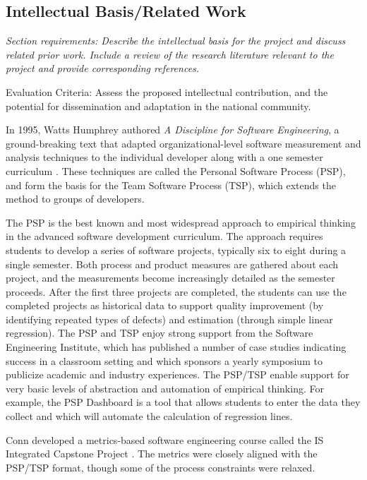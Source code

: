 \subsection{Intellectual Basis/Related Work}

{\em Section requirements: Describe the intellectual basis for the project
and discuss related prior work.  Include a review of the research
literature relevant to the project and provide corresponding references.

Evaluation Criteria: Assess the proposed intellectual contribution, and the
potential for dissemination and adaptation in the national community.}
\bigskip

In 1995, Watts Humphrey authored {\em A Discipline for Software
Engineering}, a ground-breaking text that adapted organizational-level
software measurement and analysis techniques to the individual developer
along with a one semester curriculum \citep{Humphrey95}. These techniques are called the
Personal Software Process (PSP), and form the basis for the Team Software
Process (TSP), which extends the method to groups of developers. 

The PSP is the best known and most widespread approach to empirical
thinking in the advanced software development curriculum.  The approach
requires students to develop a series of software projects, typically six
to eight during a single semester.  Both process and product measures are
gathered about each project, and the measurements become increasingly
detailed as the semester proceeds. After the first three projects are
completed, the students can use the completed projects as historical data
to support quality improvement (by identifying repeated types of defects)
and estimation (through simple linear regression).  The PSP and TSP enjoy
strong support from the Software Engineering Institute, which has published
a number of case studies indicating success in a classroom setting and
which sponsors a yearly symposium to publicize academic and industry
experiences.  The PSP/TSP enable support for very basic levels of
abstraction and automation of empirical thinking. For example, the PSP
Dashboard is a tool that allows students to enter the data they collect and
which will automate the calculation of regression lines.

Conn developed a metrics-based software engineering course called the 
IS Integrated Capstone Project \citep{Conn04}.  The metrics were closely aligned
with the PSP/TSP format, though some of the process constraints were relaxed. 

